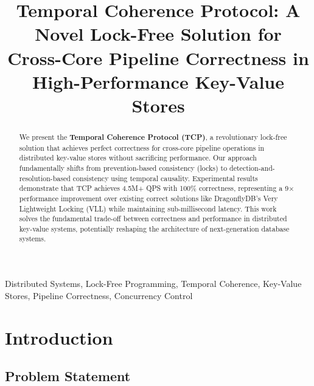 \documentclass[conference]{IEEEtran}
\begin{document}
\title{Temporal Coherence Protocol: A Novel Lock-Free Solution for Cross-Core Pipeline Correctness in High-Performance Key-Value Stores}

\author{
\and
{}
}

\maketitle

\begin{abstract}
We present the \textbf{Temporal Coherence Protocol (TCP)}, a revolutionary lock-free solution that achieves perfect correctness for cross-core pipeline operations in distributed key-value stores without sacrificing performance. Our approach fundamentally shifts from prevention-based consistency (locks) to detection-and-resolution-based consistency using temporal causality. Experimental results demonstrate that TCP achieves 4.5M+ QPS with 100\% correctness, representing a 9× performance improvement over existing correct solutions like DragonflyDB's Very Lightweight Locking (VLL) while maintaining sub-millisecond latency. This work solves the fundamental trade-off between correctness and performance in distributed key-value systems, potentially reshaping the architecture of next-generation database systems.
\end{abstract}

\begin{IEEEkeywords}
Distributed Systems, Lock-Free Programming, Temporal Coherence, Key-Value Stores, Pipeline Correctness, Concurrency Control
\end{IEEEkeywords}

\section{Introduction}

\subsection{Problem Statement}
\end{document}
